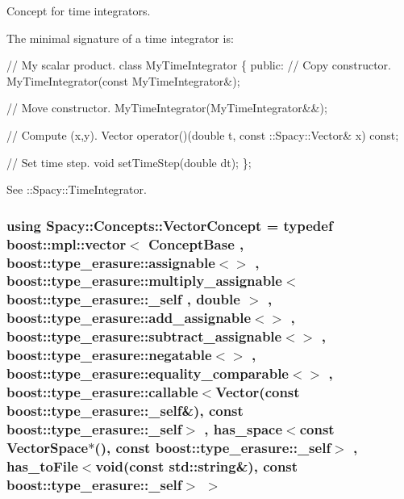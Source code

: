 Concept for time integrators. 

\label{group__ConceptGroup_ga45ecfe57ffb996aa97c9ff89a647f095_TimeIntegratorConceptAnchor}%
\hypertarget{group__ConceptGroup_ga45ecfe57ffb996aa97c9ff89a647f095_TimeIntegratorConceptAnchor}{}%
The minimal signature of a time integrator is\+: 
\begin{DoxyCode}
\textcolor{comment}{// My scalar product.}
\textcolor{keyword}{class }MyTimeIntegrator
\{
\textcolor{keyword}{public}:
  \textcolor{comment}{// Copy constructor.}
  MyTimeIntegrator(\textcolor{keyword}{const} MyTimeIntegrator&);

  \textcolor{comment}{// Move constructor.}
  MyTimeIntegrator(MyTimeIntegrator&&);

  \textcolor{comment}{// Compute (x,y).}
  Vector operator()(\textcolor{keywordtype}{double} t, const ::Spacy::Vector& x) \textcolor{keyword}{const};

  \textcolor{comment}{// Set time step.}
  \textcolor{keywordtype}{void} setTimeStep(\textcolor{keywordtype}{double} dt);
\};
\end{DoxyCode}


See \+:\+:Spacy\+:\+:Time\+Integrator. \hypertarget{group__ConceptGroup_gad6958389d1fa2758a8a64a0a24c36004_gad6958389d1fa2758a8a64a0a24c36004}{}
\subsubsection[{Vector\+Concept}]{\setlength{\rightskip}{0pt plus 5cm}using {\bf Spacy\+::\+Concepts\+::\+Vector\+Concept} = typedef boost\+::mpl\+::vector$<$ Concept\+Base , boost\+::type\+\_\+erasure\+::assignable$<$$>$ , boost\+::type\+\_\+erasure\+::multiply\+\_\+assignable$<$ boost\+::type\+\_\+erasure\+::\+\_\+self , double $>$ , boost\+::type\+\_\+erasure\+::add\+\_\+assignable$<$$>$ , boost\+::type\+\_\+erasure\+::subtract\+\_\+assignable$<$$>$ , boost\+::type\+\_\+erasure\+::negatable$<$$>$ , boost\+::type\+\_\+erasure\+::equality\+\_\+comparable$<$$>$ , boost\+::type\+\_\+erasure\+::callable$<$Vector(const boost\+::type\+\_\+erasure\+::\+\_\+self\&), const boost\+::type\+\_\+erasure\+::\+\_\+self$>$ , has\+\_\+space$<$const Vector\+Space$\ast$(), const boost\+::type\+\_\+erasure\+::\+\_\+self$>$ , has\+\_\+to\+File$<$void(const std\+::string\&), const boost\+::type\+\_\+erasure\+::\+\_\+self$>$ $>$}\label{group__ConceptGroup_gad6958389d1fa2758a8a64a0a24c36004_gad6958389d1fa2758a8a64a0a24c36004}


